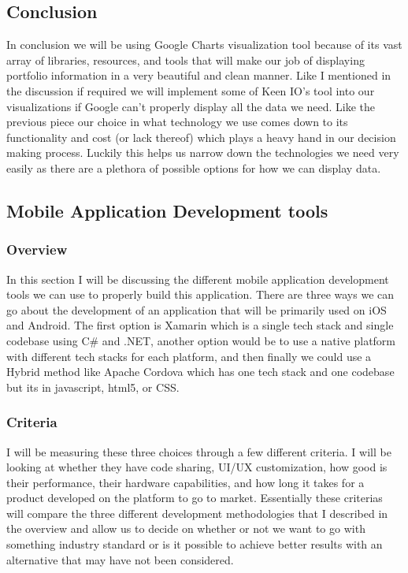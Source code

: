 \documentclass[onecolumn, draftclsnofoot,10pt, compsoc]{IEEEtran}
\begin{document}
\subsection{Conclusion}
In conclusion we will be using Google Charts visualization tool because of its vast array of libraries, resources, and tools that will make our job of displaying portfolio information in a very beautiful and clean manner. Like I mentioned in the discussion if required we will implement some of Keen IO’s tool into our visualizations if Google can’t properly display all the data we need. Like the previous piece our choice in what technology we use comes down to its functionality and cost (or lack thereof) which plays a heavy  hand in our decision making process. Luckily this helps us narrow down the technologies we need very easily as there are a plethora of possible options for how we can display data. 


\subsection{Mobile Application Development tools }

\subsubsection{Overview}
In this section I will be discussing the different mobile application development tools we can use to properly build this application. There are three ways we can go about the development of an application that will be primarily used on iOS and Android. The first option is Xamarin which is a single tech stack and single codebase using C\# and .NET, another option would be to use a native platform with different tech stacks for each platform, and then finally we could use a Hybrid method like Apache Cordova which has one tech stack and one codebase but its in javascript, html5, or CSS.

\subsubsection{Criteria}
I will be measuring these three choices through a few different criteria. I will be looking at whether they have code sharing, UI/UX customization, how good is their performance, their hardware capabilities, and how long it takes for a product developed on the platform to go to market. Essentially these criterias will compare the three different development methodologies that I described in the overview and allow us to decide on whether or not we want to go with something industry standard or is it possible to achieve better results with an alternative that may have not been considered. 
\end{document}
